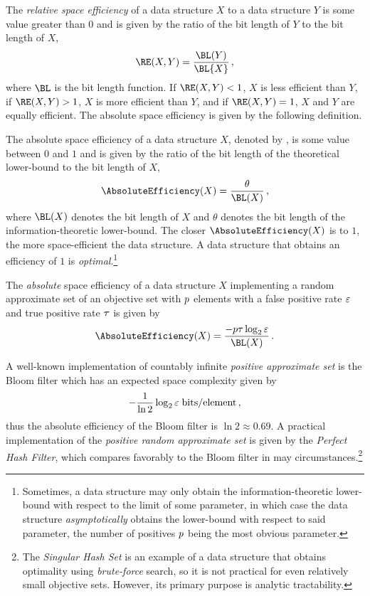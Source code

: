 \documentclass[10pt,final,hidelinks]{article}
\numberwithin{equation}{section}
\begin{document}
The \emph{relative space efficiency} of a data structure $X$ to a data structure $Y$ is some value greater than $0$ and is given by the ratio of the bit length of $Y$ to the bit length of $X$,
\begin{equation}
    \RE(X,Y) = \frac{\BL(Y)}{\BL{X}}\,,
\end{equation}
where $\BL$ is the bit length function.
If $\RE(X,Y) < 1$, $X$ is less efficient than $Y$, if $\RE(X,Y) > 1$, $X$ is more efficient than $Y$, and if $\RE(X,Y) = 1$, $X$ and $Y$ are equally efficient.
The absolute space efficiency is given by the following definition.
\begin{definition}
The absolute space efficiency of a data structure $X$, denoted by , is some value between $0$ and $1$ and is given by the ratio of the bit length of the theoretical lower-bound to the bit length of $X$,
\begin{equation}
    \AbsoluteEfficiency(X) = \frac{\theta}{\BL(X)}\,,
\end{equation}
where $\BL(X)$ denotes the bit length of $X$ and $\theta$ denotes the bit length of the information-theoretic lower-bound.
The closer $\AbsoluteEfficiency(X)$ is to $1$, the more space-efficient the data structure.
A data structure that obtains an efficiency of $1$ is \emph{optimal}.\footnote{Sometimes, a data structure may only obtain the information-theoretic lower-bound with respect to the limit of some parameter, in which case the data structure \emph{asymptotically} obtains the lower-bound with respect to said parameter, the number of positives $\p$ being the most obvious parameter.}
\end{definition}

The \emph{absolute} space efficiency of a data structure $X$ implementing a random approximate set of an objective set with $\p$ elements with a false positive rate $\fprate$ and true positive rate $\tprate$ is given by
\begin{equation}
    \AbsoluteEfficiency(X) = \frac{-\p \tprate \log_2 \fprate}{\BL(X)}\,.
\end{equation}

A well-known implementation of countably infinite \emph{positive approximate set} is the Bloom filter\cite{bf} which has an expected space complexity given 
by
\begin{equation}
    -\frac{1}{\ln 2} \log_2 \fprate \; \si{bits \per element}\,,
\end{equation}
thus the absolute efficiency of the Bloom filter is $\ln 2 \approx 0.69$.
A practical implementation of the \emph{positive random approximate set} is given by the \emph{Perfect Hash Filter}\cite{phf}, which compares favorably to the Bloom filter in may circumstances.\footnote{The \emph{Singular Hash Set}\cite{shs} is an example of a data structure that obtains optimality using \emph{brute-force} search, so it is not practical for even relatively small objective sets. However, its primary purpose is analytic tractability.}
\end{document}
